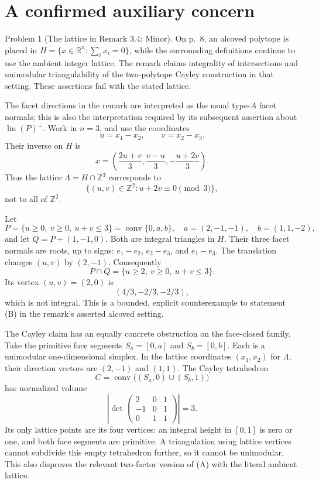 \documentclass[10pt]{article}
\begin{document}
\section*{A confirmed auxiliary concern}
Problem 1 (The lattice in Remark 3.4: Minor).  On p. 8, an alcoved polytope is placed in \(H=\{x\in\mathbb R^n:\sum_i x_i=0\}\), while the surrounding definitions continue to use the ambient integer lattice. The remark claims integrality of intersections and unimodular triangulability of the two-polytope Cayley construction in that setting. These assertions fail with the stated lattice.\par
The facet directions in the remark are interpreted as the usual type-\(A\) facet normals; this is also the interpretation required by its subsequent assertion about \(\operatorname{lin}(P)^\perp\). Work in \(n=3\), and use the coordinates \[u=x_1-x_2,\qquad v=x_2-x_3.\] Their inverse on \(H\) is \[x=\left(\frac{2u+v}{3},\frac{v-u}{3},
             -\frac{u+2v}{3}\right).\] Thus the lattice \(\Lambda=H\cap\mathbb Z^3\) corresponds to \[\{(u,v)\in\mathbb Z^2:u+2v\equiv0\pmod3\},\] not to all of \(\mathbb Z^2\).\par
Let \[P=\{u\ge0,\ v\ge0,\ u+v\le3\}
   =\operatorname{conv}\{0,a,b\},
 \quad a=(2,-1,-1),\quad b=(1,1,-2),\] and let \(Q=P+(1,-1,0)\). Both are integral triangles in \(H\). Their three facet normals are roots, up to signs: \(e_1-e_2\), \(e_2-e_3\), and \(e_1-e_3\). The translation changes \((u,v)\) by \((2,-1)\). Consequently \[P\cap Q=\{u\ge2,\ v\ge0,\ u+v\le3\}.\] Its vertex \((u,v)=(2,0)\) is \[(4/3,-2/3,-2/3),\] which is not integral. This is a bounded, explicit counterexample to statement (B) in the remark’s asserted alcoved setting.\par
The Cayley claim has an equally concrete obstruction on the face-closed family. Take the primitive face segments \(S_a=[0,a]\) and \(S_b=[0,b]\). Each is a unimodular one-dimensional simplex. In the lattice coordinates \((x_1,x_2)\) for \(\Lambda\), their direction vectors are \((2,-1)\) and \((1,1)\). The Cayley tetrahedron \[C=\operatorname{conv}\bigl((S_a,0)\cup(S_b,1)\bigr)\] has normalized volume \[\left|\det\begin{pmatrix}
 2&0&1\\[-1mm]-1&0&1\\0&1&1
 \end{pmatrix}\right|=3.\] Its only lattice points are its four vertices: an integral height in \([0,1]\) is zero or one, and both face segments are primitive. A triangulation using lattice vertices cannot subdivide this empty tetrahedron further, so it cannot be unimodular. This also disproves the relevant two-factor version of (A) with the literal ambient lattice.\par
\end{document}
